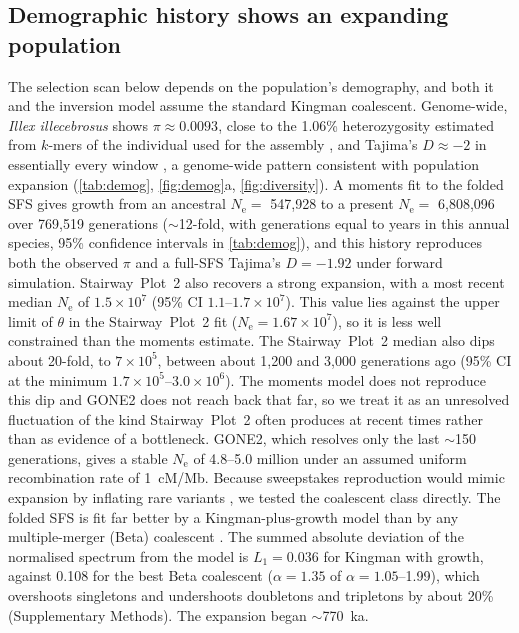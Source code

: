 \documentclass[11pt]{article}
\newcommand{\illex}{\textit{Illex illecebrosus}}
\newcommand{\Ne}{N_\mathrm{e}}
\begin{document}
\subsection{Demographic history shows an expanding population}\label{sec:demog}
The selection scan below depends on the population's demography, and both it and the inversion model assume the standard Kingman coalescent. Genome-wide, \illex{} shows $\pi\approx0.0093$, close to the 1.06\% heterozygosity estimated from $k$-mers of the individual used for the assembly \citep{small2026}, and Tajima's $D\approx-2$ in essentially every
window \citep{tajima1989,tajima1989b}, a genome-wide pattern consistent with population expansion (\cref{tab:demog},
\cref{fig:demog}a, \cref{fig:diversity}). A moments fit to the folded SFS gives growth from an ancestral
$\Ne=$ 547{,}928 to a present $\Ne=$ 6{,}808{,}096 over 769{,}519 generations ($\sim$12-fold, with generations equal to years in this annual species, 95\% confidence intervals in \cref{tab:demog}), and this history reproduces both the observed $\pi$ and a full-SFS
Tajima's $D=-1.92$ under forward simulation. Stairway~Plot~2 also recovers a strong expansion, with a most recent median $\Ne$ of $1.5\times10^{7}$ (95\% CI
$1.1$--$1.7\times10^{7}$). This value lies against the upper limit of $\theta$ in the Stairway~Plot~2 fit
($\Ne=1.67\times10^{7}$), so it is less well constrained than the moments estimate. The Stairway~Plot~2 median also
dips about 20-fold, to $7\times10^{5}$, between about 1{,}200 and 3{,}000 generations ago (95\% CI at the minimum
$1.7\times10^{5}$--$3.0\times10^{6}$). The moments model does not reproduce this dip and GONE2 does not reach back
that far, so we treat it as an unresolved fluctuation of the kind Stairway~Plot~2 often produces at recent times
rather than as evidence of a bottleneck. GONE2, which resolves only the last $\sim$150 generations, gives a stable
$\Ne$ of 4.8--5.0 million under an assumed uniform recombination rate of 1~cM/Mb. Because sweepstakes reproduction would mimic expansion by
inflating rare variants \citep{eldon2006,hedgecock2011,eldon2015}, we tested the coalescent class directly. 
The folded SFS is fit far better by a Kingman-plus-growth model than by any multiple-merger (Beta) coalescent \citep{schweinsberg2003}. The summed absolute deviation of the normalised spectrum from the model is $L_1=0.036$ for Kingman with growth, against 0.108 for the best Beta coalescent ($\alpha=1.35$ of $\alpha=1.05$--1.99), which overshoots singletons and undershoots doubletons and tripletons by about 20\% (Supplementary Methods). The expansion began $\sim$770~ka.
\end{document}
